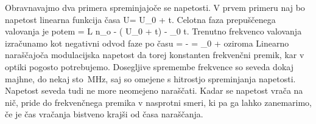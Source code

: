 Obravnavajmo dva primera spreminjajoče se napetosti. V prvem primeru naj bo 
napetost linearna funkcija časa 
\beq
U= U_0 + t.
\eeq
Celotna faza prepuščenega valovanja je potem
\beq
\phi = L n_o - \left( U_0 + 
t\right) - \omega_0 t.
\eeq
Trenutno frekvenco valovanja izračunamo kot negativni odvod faze po času
\beq
\omega = - = \omega_0 +  
\eeq
oziroma
Linearno naraščajoča modulacijska napetost da torej konstanten frekvenčni premik, kar v optiki 
pogosto potrebujemo. Dosegljive spremembe frekvence so seveda dokaj majhne,
do nekaj sto~MHz, saj so omejene s hitrostjo spreminjanja napetosti.
Napetost seveda tudi ne more neomejeno naraščati. Kadar se napetost
vrača na nič, pride do frekvenčnega premika v nasprotni smeri, ki pa ga
lahko zanemarimo, če je čas vračanja bistveno krajši od časa naraščanja.

